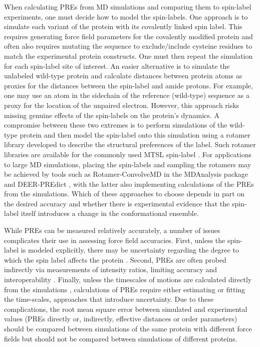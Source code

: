 \documentclass[9pt,review]{livecoms}
\begin{document}
When calculating PREs from MD simulations and comparing them to spin-label experiments, one must decide how to model the spin-labels.
One approach is to simulate each variant of the protein with its covalently linked spin label.
This requires generating force field parameters for the covalently modified protein and often also requires mutating the sequence to exclude/include cysteine residues to match the experimental protein constructs.
One must then repeat the simulation for each spin-label site of interest.
An easier alternative is to simulate the unlabeled wild-type protein and calculate distances between protein atoms as proxies for the distances between the spin-label and amide protons.
For example, one may use an atom in the sidechain of the reference (wild-type) sequence as a proxy for the location of the unpaired electron.
However, this approach risks missing genuine effects of the spin-labels on the protein’s dynamics.
A compromise between these two extremes is to perform simulations of the wild-type protein and then model the spin-label onto this simulation using a rotamer library developed to describe the structural preferences of the label.
Such rotamer libraries are available for the commonly used MTSL spin-label \cite{polyhach_rotamer_2011}.
For applications to large MD simulations, placing the spin-labels and sampling the rotamers may be achieved by tools such as Rotamer-ConvolveMD in the MDAnalysis package \cite{michaud-agrawal_mdanalysis_2011,gowers_mdanalysis_2016} and DEER-PREdict \cite{tesei_deer-predict_2021}, with the latter also implementing calculations of the PREs from the simulations.
Which of these approaches to choose depends in part on the desired accuracy and whether there is experimental evidence that the spin-label itself introduces a change in the conformational ensemble.

While PREs can be measured relatively accurately, a number of issues complicates their use in assessing force field accuracies.
First, unless the spin-label is modeled explicitly, there may be uncertainty regarding the degree to which the spin label affects the protein \cite{sasmal2017effect,tesei_deer-predict_2021}.
Second, PREs are often probed indirectly via measurements of intensity ratios, limiting accuracy and interoperability \cite{clore2009theory}.
Finally, unless the timescales of motions are calculated directly from the simulations \cite{xue2011motion}, calculations of PREs require either estimating \cite{tesei_deer-predict_2021} or fitting \cite{tesei2021accurate} the time-scales, approaches that introduce uncertainty.
Due to these complications, the root mean square error between simulated and experimental values (PREs directly or, indirectly, effective distances or order parameters) should be compared between simulations of the same protein with different force fields but should not be compared between simulations of different proteins.
\end{document}
